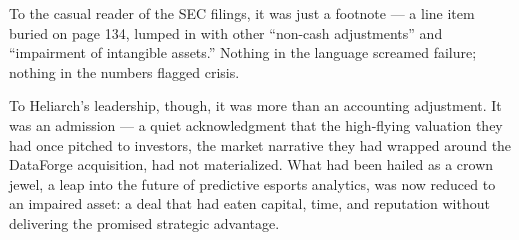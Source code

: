 \medskip 

To the casual reader of the SEC filings, it was just a footnote —
a line item buried on page 134, lumped in with other “non-cash adjustments” and “impairment of intangible assets.”
Nothing in the language screamed failure; nothing in the numbers flagged crisis.

To Heliarch’s leadership, though, it was more than an accounting adjustment.
It was an admission — a quiet acknowledgment that the high-flying valuation they had once pitched to investors, the market narrative they had wrapped around the DataForge acquisition, had not materialized.
What had been hailed as a crown jewel, a leap into the future of predictive esports analytics, was now reduced to an impaired asset: a deal that had eaten capital, time, and reputation without delivering the promised strategic advantage.

\medskip


